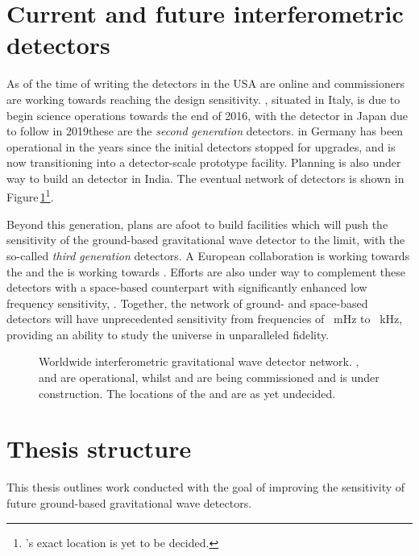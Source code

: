 \section{Current and future interferometric detectors}
As of the time of writing the \ALIGO{} detectors in the USA are online and commissioners are working towards reaching the design sensitivity. \AVIRGO{}, situated in Italy, is due to begin science operations towards the end of 2016, with the \KAGRA{} detector in Japan due to follow in 2019\textemdash these are the \emph{second generation} detectors. \GEO{} in Germany has been operational in the years since the initial detectors stopped for upgrades, and is now transitioning into a detector-scale prototype facility. Planning is also under way to build an \ALIGO{} detector in India. The eventual network of detectors is shown in Figure\,\ref{fig:detector-network}\footnote{\INDIGO{}'s exact location is yet to be decided.}.

Beyond this generation, plans are afoot to build facilities which will push the sensitivity of the ground-based gravitational wave detector to the limit, with the so-called \emph{third generation} detectors. A European collaboration is working towards the \emph{\ET{}} \cite{ET2011} and the \LSC{} is working towards \emph{\LIGOCE{}} \cite{Dwyer2015, aligocosmic2016}. Efforts are also under way to complement these detectors with a space-based counterpart with significantly enhanced low frequency sensitivity, \emph{\ELISA{}} \cite{Amaro-Seoane2012}. Together, the network of ground- and space-based detectors will have unprecedented sensitivity from frequencies of \SI{}{\milli\hertz} to \SI{}{\kilo\hertz}, providing an ability to study the universe in unparalleled fidelity.

\begin{figure}
  \centering
  
  \caption[Worldwide interferometric gravitational wave detector network]{\label{fig:detector-network}Worldwide interferometric gravitational wave detector network. \GEO{}, \LHO{} and \LLO{} are operational, whilst \VIRGO{} and \KAGRA{} are being commissioned and \INDIGO{} is under construction. The locations of the \ET{} and \LIGOCE{} are as yet undecided.}
\end{figure}

\section{Thesis structure}
This thesis outlines work conducted with the goal of improving the sensitivity of future ground-based gravitational wave detectors.

